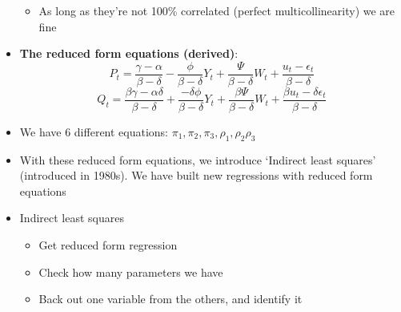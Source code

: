 \documentclass[10pt, oneside]{article}
\begin{document}
\begin{itemize}
\begin{itemize}
        \item As long as they're not 100\% correlated (perfect multicollinearity) we are fine
    \end{itemize}
    \item \textbf{The reduced form equations (derived)}:\[P_t = \frac{\gamma - \alpha}{\beta - \delta} - \frac{\phi}{\beta - \delta} Y_t + \frac{\Psi}{\beta - \delta} W_t + \frac{u_t - \epsilon_t}{\beta-\delta}\]
    \[Q_t = \frac{\beta \gamma - \alpha \delta}{\beta - \delta} + \frac{-\delta \phi}{\beta - \delta} Y_t + \frac{\beta \Psi}{\beta - \delta} W_t + \frac{\beta u_t - \delta \epsilon_t}{\beta - \delta}\]
    \item We have 6 different equations: $\pi_1, \pi_2, \pi_3, \rho_1, \rho_2 \rho_3$
    \item With these reduced form equations, we introduce `Indirect least squares' (introduced in 1980s). We have built new regressions with reduced form equations
    \item Indirect least squares
    \begin{itemize}
        \item Get reduced form regression
        \item Check how many parameters we have
        \item Back out one variable from the others, and identify it
    \end{itemize}
\end{itemize}
\end{document}
